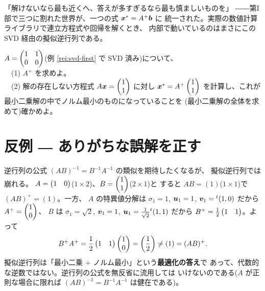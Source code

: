 「解けないなら最も近くへ、答えが多すぎるなら最も慎ましいものを」
――第I部で三つに割れた世界が、一つの式 $\bm{x}^* = A^{+}\bm{b}$ に
統一された。実際の数値計算ライブラリで連立方程式や回帰を解くとき、
内部で動いているのはまさにこの SVD 経由の擬似逆行列である。

\begin{mondai}\label{q:pinv}
$A = \begin{pmatrix}1 & 1 \\ 0 & 0\end{pmatrix}$(例 \ref{rei:svd-first} で SVD 済み)について、\\
　(1) $A^{+}$ を求めよ。\\
　(2) 解の存在しない方程式 $A\bm{x} = \begin{pmatrix}1 \\ 1\end{pmatrix}$ に対し
$\bm{x}^{*} = A^{+}\begin{pmatrix}1 \\ 1\end{pmatrix}$ を計算し、これが
最小二乗解の中でノルム最小のものになっていることを
(最小二乗解の全体を求めて)確かめよ。
\end{mondai}

\section{反例 ― ありがちな誤解を正す}

\begin{hanrei}[$(AB)^{+} = B^{+}A^{+}$ は一般には成り立たない]\label{hanrei:pinv-product}
逆行列の公式 $(AB)^{-1} = B^{-1}A^{-1}$ の類似を期待したくなるが、
擬似逆行列では崩れる。
$A = \begin{pmatrix}1 & 0\end{pmatrix}$($1 \times 2$)、$B = \begin{pmatrix}1 \\ 1\end{pmatrix}$($2 \times 1$)と
すると $AB = (1)$($1 \times 1$)で $(AB)^{+} = (1)$。一方、
$A$ の特異値分解は $\sigma_1 = 1$, $\bm{u}_1 = 1$,
$\bm{v}_1 = {}^t(1, 0)$ だから $A^{+} = \begin{pmatrix}1 \\ 0\end{pmatrix}$、
$B$ は $\sigma_1 = \sqrt{2}$, $\bm{v}_1 = 1$,
$\bm{u}_1 = \frac{1}{\sqrt{2}}{}^t(1, 1)$ だから
$B^{+} = \frac{1}{2}\begin{pmatrix}1 & 1\end{pmatrix}$。よって
\[
B^{+}A^{+} = \frac{1}{2}\begin{pmatrix}1 & 1\end{pmatrix}\begin{pmatrix}1 \\ 0\end{pmatrix} = \left(\frac{1}{2}\right)
\neq (1) = (AB)^{+}.
\]
擬似逆行列は「最小二乗 $+$ ノルム最小」という\textbf{最適化の答え}で
あって、代数的な逆数ではない。逆行列の公式を無反省に流用しては
いけないのである($A$ が正則な場合に限れば
$(AB)^{-1} = B^{-1}A^{-1}$ は健在である)。
\end{hanrei}

